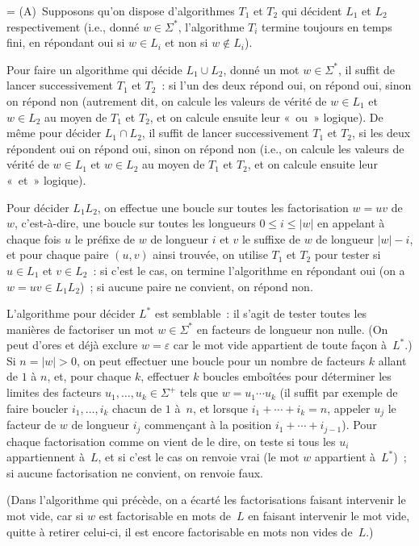 \documentclass[12pt,a4paper]{article}
\theoremstyle{definition}
\newif\ifcorrige
\newenvironment{corrige}%
{\ifcorrige\relax\else\setbox0=\vbox\bgroup\fi%
\smallbreak\footnotesize\noindent{\underbar{\textit{Corrigé.}}\quad}}
{{\hbox{}\nobreak\hfill\checkmark}%
\ifcorrige\relax\else\egroup\fi\par}
\begin{document}
\begin{corrige}
(A) Supposons qu'on dispose d'algorithmes $T_1$ et $T_2$ qui décident
  $L_1$ et $L_2$ respectivement (i.e., donné $w \in \Sigma^*$,
  l'algorithme $T_i$ termine toujours en temps fini, en répondant oui
  si $w\in L_i$ et non si $w\not\in L_i$).

Pour faire un algorithme qui décide $L_1\cup L_2$, donné un mot
$w\in\Sigma^*$, il suffit de lancer successivement $T_1$ et $T_2$ : si
l'un des deux répond oui, on répond oui, sinon on répond non
(autrement dit, on calcule les valeurs de vérité de $w\in L_1$ et
$w\in L_2$ au moyen de $T_1$ et $T_2$, et on calcule ensuite leur
« ou » logique).  De même pour décider $L_1\cap L_2$, il suffit de
lancer successivement $T_1$ et $T_2$, si les deux répondent oui on
répond oui, sinon on répond non (i.e., on calcule les valeurs de
vérité de $w\in L_1$ et $w\in L_2$ au moyen de $T_1$ et $T_2$, et on
calcule ensuite leur « et » logique).

Pour décider $L_1 L_2$, on effectue une boucle sur toutes les
factorisation $w = uv$ de $w$, c'est-à-dire, une boucle sur toutes les
longueurs $0\leq i\leq |w|$ en appelant à chaque fois $u$ le préfixe
de $w$ de longueur $i$ et $v$ le suffixe de $w$ de longueur $|w|-i$,
et pour chaque paire $(u,v)$ ainsi trouvée, on utilise $T_1$ et $T_2$
pour tester si $u\in L_1$ et $v\in L_2$ : si c'est le cas, on termine
l'algorithme en répondant oui (on a $w = uv \in L_1 L_2$) ; si aucune
paire ne convient, on répond non.

L'algorithme pour décider $L^*$ est semblable : il s'agit de tester
toutes les manières de factoriser un mot $w \in \Sigma^*$ en facteurs
de longueur non nulle.  (On peut d'ores et déjà exclure
$w=\varepsilon$ car le mot vide appartient de toute façon à $L^*$.)
Si $n=|w| > 0$, on peut effectuer une boucle pour un nombre de
facteurs $k$ allant de $1$ à $n$, et, pour chaque $k$, effectuer $k$
boucles emboîtées pour déterminer les limites des facteurs
$u_1,\ldots,u_k \in \Sigma^+$ tels que $w = u_1\cdots u_k$ (il suffit
par exemple de faire boucler $i_1,\ldots,i_k$ chacun de $1$ à $n$, et
lorsque $i_1+\cdots+i_k = n$, appeler $u_j$ le facteur de $w$ de
longueur $i_j$ commençant à la position $i_1+\cdots+i_{j-1}$).  Pour
chaque factorisation comme on vient de le dire, on teste si tous les
$u_i$ appartiennent à $L$, et si c'est le cas on renvoie vrai (le mot
$w$ appartient à $L^*$) ; si aucune factorisation ne convient, on
renvoie faux.

(Dans l'algorithme qui précède, on a écarté les factorisations faisant
intervenir le mot vide, car si $w$ est factorisable en mots de $L$ en
faisant intervenir le mot vide, quitte à retirer celui-ci, il est
encore factorisable en mots non vides de $L$.)


\end{corrige}
\end{document}
